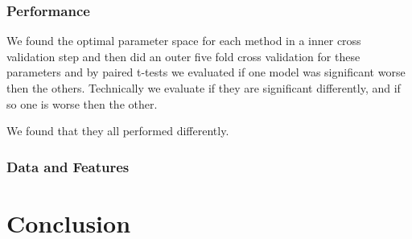 \subsection{Performance} 
We found the optimal parameter space for each method in a inner cross validation step and then did an outer five fold cross validation for these parameters and by paired t-tests we evaluated if one model was significant worse then the others. Technically we evaluate if they are significant differently, and if so one is worse then the other.

We found that they all performed differently.

\subsection{Data and Features}


\chapter{Conclusion}



